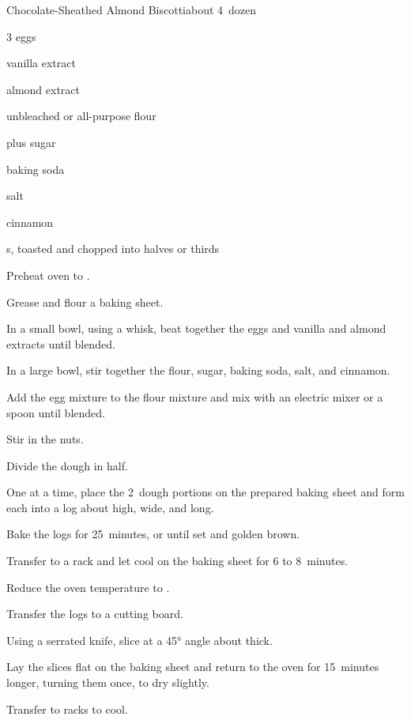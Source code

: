 \begin{recipe}{Chocolate-Sheathed Almond Biscotti}{}{about 4\half\ dozen}

\begin{ingredients}
\item 3 eggs
\item {} vanilla extract
\item \tp{\quarter} almond extract
\item \C{2\quarter} unbleached or all-purpose flour
\item \C{\threequarter} plus  sugar
\item {} baking soda
\item \tp{\half} salt
\item {} cinnamon
\item \C{\threequarter} s, toasted and chopped into halves or thirds
\end{ingredients}

\begin{directions}
\item Preheat oven to .
\item Grease and flour a baking sheet.
\item In a small bowl, using a whisk, beat together the eggs and vanilla and almond extracts until blended.
\item In a large bowl, stir together the flour, sugar, baking soda, salt, and cinnamon.
\item Add the egg mixture to the flour mixture and mix with an electric mixer or a spoon until blended.
\item Stir in the nuts.
\item Divide the dough in half.
\item One at a time, place the 2~dough portions on the prepared baking sheet and form each into a log about \inch{\half} high, \inch{1 \half} wide, and  long.
\item Bake the logs for 25~minutes, or until set and golden brown.
\item Transfer to a rack and let cool on the baking sheet for 6 to 8~minutes.
\item Reduce the oven temperature to .
\item Transfer the logs to a cutting board.
\item Using a serrated knife, slice at a \ang{45} angle about \cm{\half} thick.
\item Lay the slices flat on the baking sheet and return to the oven for 15~minutes longer, turning them once, to dry slightly.
\item Transfer to racks to cool.
\end{directions}


\end{recipe}
